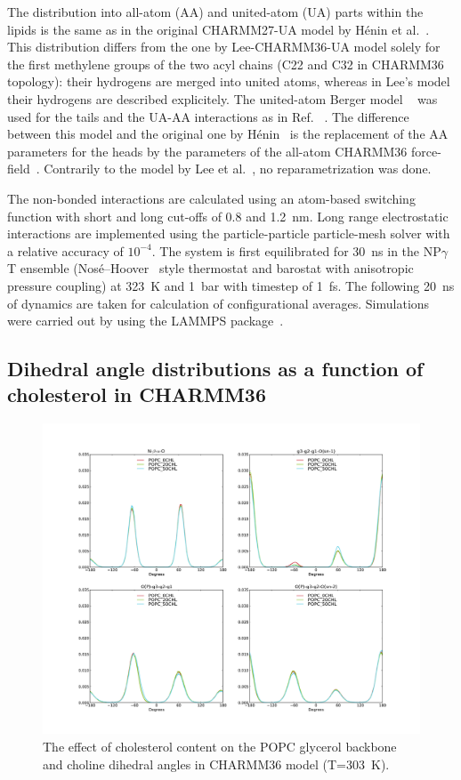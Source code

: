 \documentclass[journal=jacsat,manuscript=article]{achemso}
\begin{document}
The distribution into all-atom  (AA) and united-atom (UA) parts within the lipids is the same
as in the original CHARMM27-UA model by H\'enin et al.~\cite{henin08}.  
This distribution differs from the one by Lee-CHARMM36-UA model solely
for the first methylene groups of the two acyl chains (C22 and C32 in CHARMM36 topology): 
their hydrogens are merged into  united atoms, whereas in Lee's model their hydrogens are described explicitely.
The  united-atom Berger model ~\cite{berger97} was used for the tails and the UA-AA interactions as in Ref. ~. 
The difference between this model and the original one by H\'enin~\cite{henin08} is the replacement of the 
AA parameters for the heads by  the parameters of the all-atom
 CHARMM36 force-field~\cite{klauda10}. Contrarily to the model by Lee et al.~\cite{lee14}, no reparametrization was done.

The non-bonded interactions are calculated using an atom-based switching function with short and long cut-offs of 0.8 and 1.2~nm. 
Long range electrostatic interactions are implemented using the particle-particle particle-mesh solver with a relative accuracy of $10^{-4}$. The system 
is first equilibrated for 30~ns in the NP$\gamma$T ensemble (Nos\'{e}--Hoover~\cite{nose84,hoover85} style thermostat and barostat with anisotropic pressure coupling) 
at 323~K and 1~bar with timestep of 1~fs. The following 20~ns of dynamics are taken for calculation of configurational averages. 
Simulations were carried out by using the LAMMPS package~\cite{plimpton95}. %

\subsection{Dihedral angle distributions as a function of cholesterol in CHARMM36}
\begin{figure}[]
  \centering
  \includegraphics[width=17.2cm]{../Fig/dihsCHOLcharmm.pdf}
  \caption{\label{dihsCHOLcharmm}
    The effect of cholesterol content on the POPC glycerol backbone and choline dihedral angles in CHARMM36 model (T=303~K).}
\end{figure}
\end{document}
